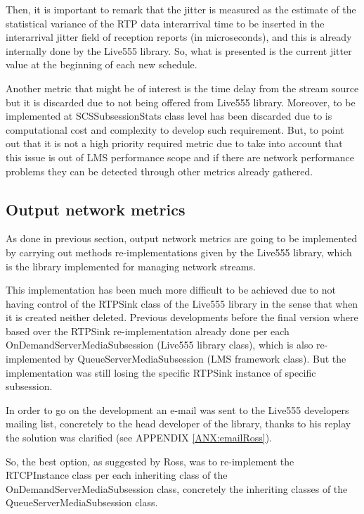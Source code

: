 Then, it is important to remark that the jitter is measured as the estimate of the statistical variance of the RTP data interarrival time to be inserted in the interarrival jitter field of reception reports (in microseconds), and this is already internally done by the Live555 library. So, what is presented is the current jitter value at the beginning of each new schedule.

Another metric that might be of interest is the time delay from the stream source but it is discarded due to not being offered from Live555 library. Moreover, to be implemented at SCSSubsessionStats class level has been discarded due to is computational cost and complexity to develop such requirement. But, to point out that it is not a high priority required metric due to take into account that this issue is out of LMS performance scope and if there are network performance problems they can be detected through other metrics already gathered.


\subsection{Output network metrics}

As done in previous section, output network metrics are going to be implemented by carrying out methods re-implementations given by the Live555 library, which is the library implemented for managing network streams.

This implementation has been much more difficult to be achieved due to not having control of the RTPSink class of the Live555 library in the sense that when it is created neither deleted. Previous developments before the final version where based over the RTPSink re-implementation already done per each OnDemandServerMediaSubsession (Live555 library class), which is also re-implemented by QueueServerMediaSubsession (LMS framework class). But the implementation was still losing the specific RTPSink instance of specific subsession.

In order to go on the development an e-mail was sent to the Live555 developers mailing list, concretely to the head developer of the library, thanks to his replay the solution was clarified (see APPENDIX \ref{ANX:emailRoss}).

So, the best option, as suggested by Ross, was to re-implement the RTCPInstance class per each inheriting class of the OnDemandServerMediaSubsession class, concretely the inheriting classes of the QueueServerMediaSubsession class. 

